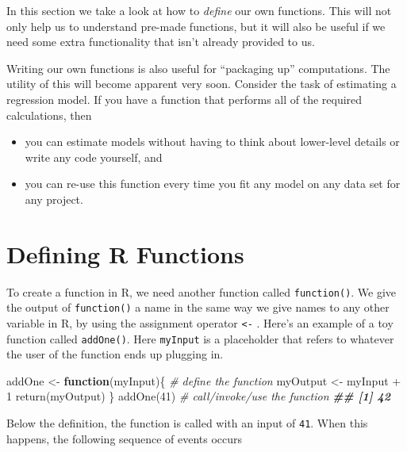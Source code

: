 \documentclass[
  12pt,
  krantz2]{krantz}
\makeatletter
\newenvironment{Shaded}{\begin{snugshade}}{\end{snugshade}}
\newcommand{\CommentTok}[1]{\textcolor[rgb]{0.37,0.37,0.37}{\textit{#1}}}
\newcommand{\ControlFlowTok}[1]{\textcolor[rgb]{0.27,0.27,0.27}{\textbf{#1}}}
\newcommand{\DecValTok}[1]{\textcolor[rgb]{0.06,0.06,0.06}{#1}}
\newcommand{\DocumentationTok}[1]{\textcolor[rgb]{0.37,0.37,0.37}{\textbf{\textit{#1}}}}
\newcommand{\FunctionTok}[1]{\textcolor[rgb]{0,0,0}{#1}}
\newcommand{\NormalTok}[1]{#1}
\newcommand{\OtherTok}[1]{\textcolor[rgb]{0.37,0.37,0.37}{#1}}
\newcommand{\SpecialCharTok}[1]{\textcolor[rgb]{0,0,0}{#1}}
\providecommand{\tightlist}{%
  \setlength{\itemsep}{0pt}\setlength{\parskip}{0pt}}
\newenvironment{kframe}{%
\medskip{}
\setlength{\fboxsep}{.8em}
 \def\at@end@of@kframe{}%
 \ifinner\ifhmode%
  \def\at@end@of@kframe{\end{minipage}}%
  \begin{minipage}{\columnwidth}%
 \fi\fi%
 \def\FrameCommand##1{\hskip\@totalleftmargin \hskip-\fboxsep
 \colorbox{shadecolor}{##1}\hskip-\fboxsep
     \hskip-\linewidth \hskip-\@totalleftmargin \hskip\columnwidth}%
 \MakeFramed {\advance\hsize-\width
   \@totalleftmargin\z@ \linewidth\hsize
   \@setminipage}}%
 {\par\unskip\endMakeFramed%
 \at@end@of@kframe}
\renewenvironment{Shaded}{\begin{kframe}}{\end{kframe}}
\makeatother
\begin{document}
In this section we take a look at how to \emph{define} our own functions. This will not only help us to understand pre-made functions, but it will also be useful if we need some extra functionality that isn't already provided to us.

Writing our own functions is also useful for ``packaging up'' computations. The utility of this will become apparent very soon. Consider the task of estimating a regression model. If you have a function that performs all of the required calculations, then

\begin{itemize}
\tightlist
\item
  you can estimate models without having to think about lower-level details or write any code yourself, and
\item
  you can re-use this function every time you fit any model on any data set for any project.
\end{itemize}

\hypertarget{defining-r-functions}{%
\section{Defining R Functions}\label{defining-r-functions}}

To create a function in R, we need another function called \texttt{function()}. We give the output of \texttt{function()} a name in the same way we give names to any other variable in R, by using the assignment operator \texttt{\textless{}-} . Here's an example of a toy function called \texttt{addOne()}. Here \texttt{myInput} is a placeholder that refers to whatever the user of the function ends up plugging in.

\begin{Shaded}
\begin{Highlighting}[]
\NormalTok{addOne }\OtherTok{\textless{}{-}} \ControlFlowTok{function}\NormalTok{(myInput)\{  }\CommentTok{\# define the function}
\NormalTok{  myOutput }\OtherTok{\textless{}{-}}\NormalTok{ myInput }\SpecialCharTok{+} \DecValTok{1}
  \FunctionTok{return}\NormalTok{(myOutput)}
\NormalTok{\}}
\FunctionTok{addOne}\NormalTok{(}\DecValTok{41}\NormalTok{) }\CommentTok{\# call/invoke/use the function }
\DocumentationTok{\#\# [1] 42}
\end{Highlighting}
\end{Shaded}

Below the definition, the function is called with an input of \texttt{41}. When this happens, the following sequence of events occurs
\end{document}

